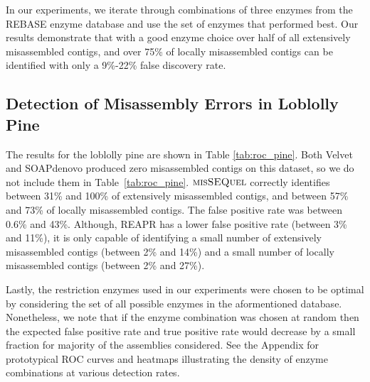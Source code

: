 In our experiments, we iterate through combinations of three enzymes from the REBASE enzyme database \cite{roberts2010rebase} and use the set of enzymes that performed best.  
Our results demonstrate that with a good enzyme choice over half of all extensively misassembled contigs, and over 75\% of locally misassembled contigs can be identified with only a 9\%-22\% false discovery rate.
 
\subsection{Detection of Misassembly Errors in Loblolly Pine}\label{sec:pine}

The results for the loblolly pine are shown in Table \ref{tab:roc_pine}.  Both Velvet and SOAPdenovo produced zero misassembled contigs on this dataset, so we do not include them in Table~\ref{tab:roc_pine}.
$\mbox{\rm {\sc misSEQuel}}$ correctly identifies between 31\% and 100\% of extensively misassembled contigs, and between 57\% and 73\% of locally misassembled contigs.  The false positive rate was between 0.6\% and 43\%.  Although, REAPR has a lower false positive rate (between 3\% and 11\%), it is only capable of identifying a small number of extensively misassembled contigs (between 2\% and 14\%) and a small number of locally misassembled contigs (between 2\% and 27\%).  

Lastly, the restriction enzymes used in our experiments were chosen to be optimal by considering the set of all possible enzymes in the aformentioned database.  
Nonetheless, we note that if the enzyme combination was chosen at random then the expected false positive rate and true positive rate would decrease by a small fraction for majority of the assemblies considered.  
See the Appendix for prototypical ROC curves and heatmaps illustrating the density of enzyme combinations at various detection rates.



